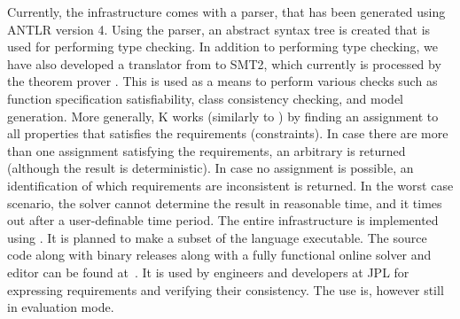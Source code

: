 Currently, the \Klang{} infrastructure comes with a parser, that has
been generated using ANTLR version 4. Using the parser, an abstract syntax
tree is
created that is used for performing type checking. In addition to
performing type checking, we have also developed a translator from
\Klang{} to SMT2, which currently is processed by the \zthree{}
theorem prover \cite{de2008z3}.  This is used as a means to perform various checks
such as function specification satisfiability, class consistency
checking, and model generation. 
More generally, K works (similarly to \zthree{}) by finding an 
assignment to all properties that satisfies the requirements (constraints). 
In case there are more than one assignment satisfying the 
requirements, an arbitrary is returned (although the result is 
deterministic). In case no assignment is possible, an 
identification of which 
requirements are inconsistent is returned. In the worst
case scenario, the solver cannot determine the result 
in reasonable time, and it times out after a user-definable
time period.
The entire \Klang{} infrastructure is
implemented using \scala. It is planned to make a subset
of the language executable. The source code along with binary
releases along with a fully functional online solver and \Klang{}
editor can be found at~\cite{theklanguage}. It is used by engineers and
developers at JPL for expressing requirements and verifying their
consistency. The use is, however still in evaluation mode.

 
